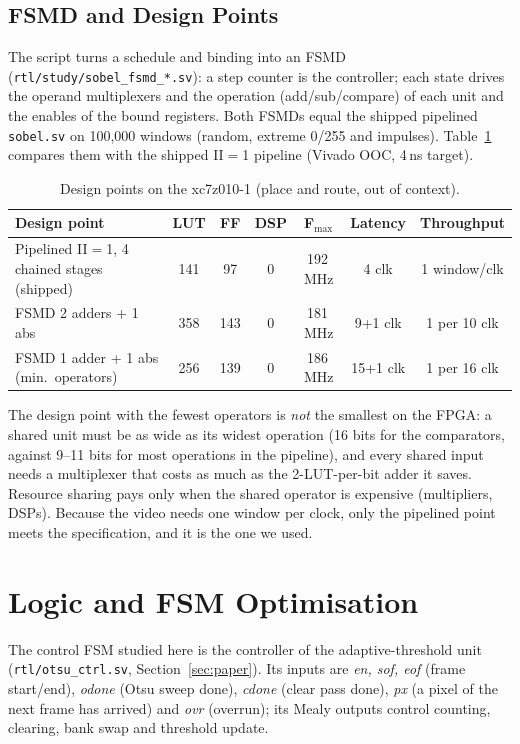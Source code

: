 \documentclass[11pt,a4paper]{article}
\begin{document}
\subsection{FSMD and Design Points}
The script turns a schedule and binding into an FSMD (\texttt{rtl/study/sobel\_fsmd\_*.sv}): a step counter is the controller;
each state drives the operand multiplexers and the operation (add/sub/compare) of each unit and the enables of the bound
registers. Both FSMDs equal the shipped pipelined \texttt{sobel.sv} on 100{,}000 windows (random, extreme 0/255 and impulses).
Table~\ref{tab:designpoints} compares them with the shipped II$=$1 pipeline (Vivado OOC, 4\,ns target).

\begin{table}[H]\centering\footnotesize
\caption{Design points on the xc7z010-1 (place and route, out of context).}\label{tab:designpoints}
\begin{tabular}{@{}lcccccc@{}}
\toprule
Design point & LUT & FF & DSP & F$_\text{max}$ & Latency & Throughput\\
\midrule
Pipelined II$=$1, 4 chained stages (shipped) & 141 & 97 & 0 & 192\,MHz & 4 clk & 1 window/clk\\
FSMD 2 adders + 1 abs & 358 & 143 & 0 & 181\,MHz & 9+1 clk & 1 per 10 clk\\
FSMD 1 adder + 1 abs (min.\ operators) & 256 & 139 & 0 & 186\,MHz & 15+1 clk & 1 per 16 clk\\
\bottomrule
\end{tabular}
\end{table}
The design point with the fewest operators is \emph{not} the smallest on the FPGA: a shared unit must be as wide as its widest
operation (16 bits for the comparators, against 9--11 bits for most operations in the pipeline), and every shared input
needs a multiplexer that costs as much as the 2-LUT-per-bit adder it saves. Resource sharing pays only when the shared
operator is expensive (multipliers, DSPs). Because the video needs one window per clock, only the pipelined point meets
the specification, and it is the one we used.

\section{Logic and FSM Optimisation}
\label{sec:logic}
The control FSM studied here is the controller of the adaptive-threshold unit (\texttt{rtl/otsu\_ctrl.sv},
Section~\ref{sec:paper}). Its inputs are \emph{en, sof, eof} (frame start/end), \emph{odone} (Otsu sweep done), \emph{cdone} (clear pass
done), \emph{px} (a pixel of the next frame has arrived) and \emph{ovr} (overrun); its Mealy outputs control counting,
clearing, bank swap and threshold update.
\end{document}
